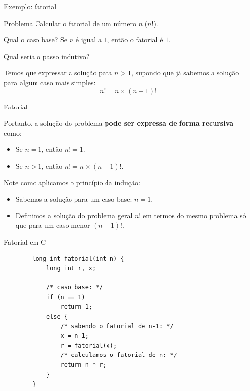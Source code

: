 \documentclass[handout]{beamer}
\begin{document}
\begin{frame}[fragile]{Exemplo: fatorial}

    \begin{block}{Problema}
        Calcular o fatorial de um número $n$ ($n!$).
    \end{block}

    Qual o caso base?
    \pause
    Se $n$ é igual a $1$, então o fatorial é $1$.

    Qual seria o passo indutivo?
    \pause

    Temos que expressar a solução para $n> 1$, supondo que já sabemos a solução para algum caso mais simples:
    \pause
    $$n! = n \times (n-1)!$$
\end{frame}

\begin{frame}[fragile]{Fatorial}

    Portanto, a solução do problema {\bf pode ser expressa de forma recursiva} como:
    \begin{itemize}
        \item Se $n=1$, então $n! = 1$.
        \item Se $n>1$, então $n! = n \times (n-1)!$.
    \end{itemize}

    \pause

    Note como aplicamos o princípio da indução:
    \begin{itemize}
        \item Sabemos a solução para um caso base: $n=1$.
        \item Definimos a solução do problema geral $n!$ em termos do mesmo problema só que para um caso menor $(n-1)!$.
    \end{itemize}
\end{frame}

\begin{frame}[fragile]{Fatorial em C}

    \begin{verbatim}
        long int fatorial(int n) {
            long int r, x;

            /* caso base: */
            if (n == 1)
                return 1;
            else {
                /* sabendo o fatorial de n-1: */
                x = n-1;
                r = fatorial(x);
                /* calculamos o fatorial de n: */
                return n * r;
            }
        }
    \end{verbatim}
\end{frame}
\end{document}

